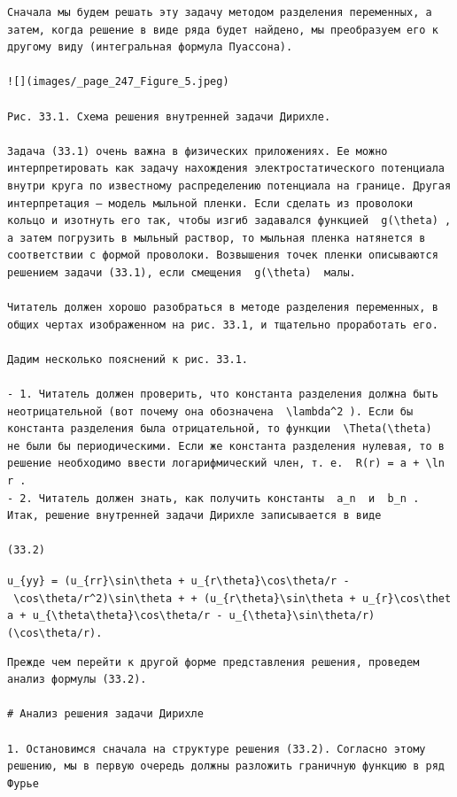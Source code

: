 \documentclass[
  ukrainian,
]{article}
\begin{document}
\begin{verbatim}
Сначала мы будем решать эту задачу методом разделения переменных, а затем, когда решение в виде ряда будет найдено, мы преобразуем его к другому виду (интегральная формула Пуассона).

![](images/_page_247_Figure_5.jpeg)

Рис. 33.1. Схема решения внутренней задачи Дирихле.

Задача (33.1) очень важна в физических приложениях. Ее можно интерпретировать как задачу нахождения электростатического потенциала внутри круга по известному распределению потенциала на границе. Другая интерпретация — модель мыльной пленки. Если сделать из проволоки кольцо и изотнуть его так, чтобы изгиб задавался функцией  g(\theta) , а затем погрузить в мыльный раствор, то мыльная пленка натянется в соответствии с формой проволоки. Возвышения точек пленки описываются решением задачи (33.1), если смещения  g(\theta)  малы.

Читатель должен хорошо разобраться в методе разделения переменных, в общих чертах изображенном на рис. 33.1, и тщательно проработать его.

Дадим несколько пояснений к рис. 33.1.

- 1. Читатель должен проверить, что константа разделения должна быть неотрицательной (вот почему она обозначена  \lambda^2 ). Если бы константа разделения была отрицательной, то функции  \Theta(\theta)  не были бы периодическими. Если же константа разделения нулевая, то в решение необходимо ввести логарифмический член, т. е.  R(r) = a + \ln r .
- 2. Читатель должен знать, как получить константы  a_n  и  b_n . Итак, решение внутренней задачи Дирихле записывается в виде

(33.2)
\end{verbatim}

\texttt{u\_\{yy\}\ =\ (u\_\{rr\}\textbackslash{}sin\textbackslash{}theta\ +\ u\_\{r\textbackslash{}theta\}\textbackslash{}cos\textbackslash{}theta/r\ -\ \textbackslash{}cos\textbackslash{}theta/r\^{}2)\textbackslash{}sin\textbackslash{}theta\ +\ +\ (u\_\{r\textbackslash{}theta\}\textbackslash{}sin\textbackslash{}theta\ +\ u\_\{r\}\textbackslash{}cos\textbackslash{}theta\ +\ u\_\{\textbackslash{}theta\textbackslash{}theta\}\textbackslash{}cos\textbackslash{}theta/r\ -\ u\_\{\textbackslash{}theta\}\textbackslash{}sin\textbackslash{}theta/r)(\textbackslash{}cos\textbackslash{}theta/r).}

\begin{verbatim}
Прежде чем перейти к другой форме представления решения, проведем анализ формулы (33.2).

# Анализ решения задачи Дирихле

1. Остановимся сначала на структуре решения (33.2). Согласно этому решению, мы в первую очередь должны разложить граничную функцию в ряд Фурье
\end{verbatim}
\end{document}
